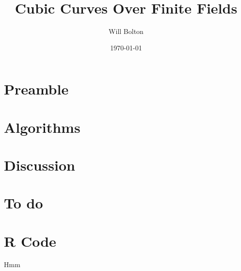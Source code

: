 \documentclass{article}
\title{Cubic Curves Over Finite Fields}
\author{Will Bolton}
\date{\today}
\begin{document}
\maketitle
\tableofcontents

\section{Preamble}

\clearpage

\clearpage

\section{Algorithms}
\lipsum[1-3]

\section{Discussion}

\clearpage

\section{To do}
\listoftodos

\appendix
\section{R Code}
Hmm
\cite{silverman-rational}
\cite{silverman-arithmetic}
\cite{fraleigh2013}
\cite{goodman1998}

\end{document}
